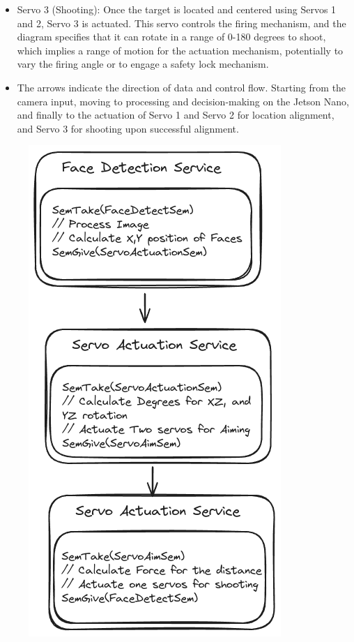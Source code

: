 \documentclass[a4paper,11pt]{article}%
\newenvironment{qanda}{\setlength{\parindent}{0pt}}{\bigskip}
\begin{document}
\begin{qanda}
\begin{enumerate}
\begin{itemize}
				\item Servo 3 (Shooting): Once the target is located and centered using Servos 1 and 2, Servo 3 is actuated. This servo controls the firing mechanism, and the diagram specifies that it can rotate in a range of 0-180 degrees to shoot, which implies a range of motion for the actuation mechanism, potentially to vary the firing angle or to engage a safety lock mechanism.
				\item The arrows indicate the direction of data and control flow. Starting from the camera input, moving to processing and decision-making on the Jetson Nano, and finally to the actuation of Servo 1 and Servo 2 for location alignment, and Servo 3 for shooting upon successful alignment.
			\end{itemize}


			\begin{figure}[H]
				\centering
				\includegraphics[scale=0.40]{figures/dataflow.png}

\end{figure}
\end{enumerate}
\end{qanda}
\end{document}
